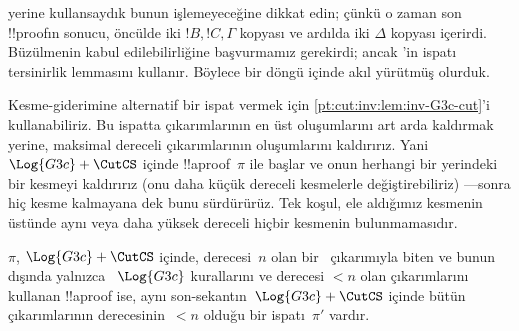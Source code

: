 \documentclass[../../../include/open-logic-section]{subfiles}
\begin{document}
\CutCS{} yerine \Cut{} kullansaydık bunun işlemeyeceğine dikkat edin;
çünkü o zaman son !!{proof}{}ın sonucu, öncülde iki $!B, !C, \Gamma$ kopyası
ve ardılda iki $\Delta$ kopyası içerirdi. Büzülmenin kabul edilebilirliğine
başvurmamız gerekirdi; ancak 'in ispatı
tersinirlik lemmasını kullanır. Böylece bir döngü içinde akıl yürütmüş
olurduk.

Kesme-giderimine alternatif bir ispat vermek için
\cref{pt:cut:inv:lem:inv-G3c-cut}'i kullanabiliriz. Bu ispatta \CutCS{}
çıkarımlarının en üst oluşumlarını art arda kaldırmak yerine, maksimal
dereceli \CutCS{} çıkarımlarının oluşumlarını kaldırırız. Yani $\Log{G3c} +
\CutCS$ içinde !!a{proof}~$\pi$ ile başlar ve onun herhangi bir yerindeki
bir kesmeyi kaldırırız (onu daha küçük dereceli kesmelerle değiştirebiliriz)
---sonra hiç kesme kalmayana dek bunu sürdürürüz. Tek koşul, ele aldığımız
kesmenin üstünde aynı veya daha yüksek dereceli hiçbir kesmenin
bulunmamasıdır.

\begin{lem} $\pi$, $\Log{G3c}+\CutCS$ içinde,
derecesi~$n$ olan bir~\CutCS{} çıkarımıyla biten ve bunun dışında yalnızca
~$\Log{G3c}$ kurallarını ve derecesi $<n$ olan \CutCS{} çıkarımlarını
kullanan !!a{proof} ise, aynı son-sekantın~$\Log{G3c} + \CutCS$ içinde bütün
\CutCS{} çıkarımlarının derecesinin~$<n$ olduğu bir ispatı~$\pi'$ vardır.
\end{lem}
\end{document}
